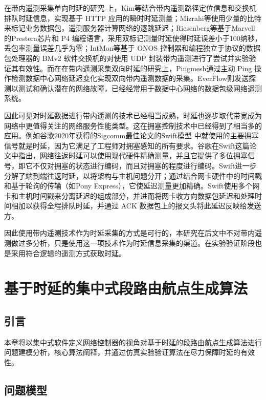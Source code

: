 在带内遥测采集单向时延的研究 \cite{INTSURVEY} 上，Kim等结合带内遥测路径定位信息和交换机排队时延信息，实现基于 \gls*{HTTP} 应用的瞬时时延测量；Mizrahi等使用少量的比特来标记业务数据包，遥测服务器计算网络的逐跳延迟；Riesenberg等基于Marvell的Prestera芯片和 \gls*{P4} 编程语言，采用双标记测量时延使得时延误差小于100纳秒，丢包率测量误差几乎为零；IntMon等基于 \gls*{ONOS} 控制器和编程独立于协议的数据包处理器的 \gls*{BMv2} 软件交换机的对使用 \gls*{UDP} 封装带内遥测进行了尝试并实验验证其有效性。而在在带内遥测采集双向时延的研究上，Pingmesh通过主动 \gls*{Ping} 操作检测数据中心网络延迟变化实现双向带内遥测数据的采集。EverFlow则发送探测以测试和确认潜在的网络故障，已经经常用于数据中心网络的数据包级网络遥测系统。

因此可见对时延数据进行带内遥测的技术已经相当成熟，时延也逐步取代带宽成为网络中更值得关注的网络服务性能类型。这在拥塞控制技术中已经得到了相当多的应用。例如谷歌2020年获得的Sigcomm最佳论文的Swift模型 \cite{SWIFT} 中就使用的主要拥塞信号就是时延，因为它满足了工程师对拥塞感知的所有要求。谷歌在Swift这篇论文中指出，网络往返时延可以使用现代硬件精确测量，并且它提供了多位拥塞信号，即它不仅对拥塞的状态进行编码，而且对拥塞的程度进行编码。Swift进一步分解了端到端往返时延，以将架构与主机问题分开；通过结合网卡硬件中的时间戳和基于轮询的传输（如Pony Express），它使延迟测量更加精确。Swift使用多个网卡和主机时间戳来分离延迟的组成部分，并进而将网卡收方向数据包延迟和处理时间相加以获得全程排队时延，并通过 \gls*{ACK} 数据包上的报文头将此延迟反映给发送方。

因此使用带内遥测技术作为时延采集的方式是可行的，本研究在后文中不对带内遥测做过多分析，只是使用这一项技术作为时延信息采集的渠道。在实验验证阶段也是采用符合逻辑的遥测方式获取时延。


\chapter{基于时延的集中式段路由航点生成算法}

\section{引言}

本章将以集中式软件定义网络控制器的视角对基于时延的段路由航点生成算法进行问题建模分析，核心算法阐释，并通过仿真实验验证算法在尽力保障时延的有效性。

\section{问题模型}


